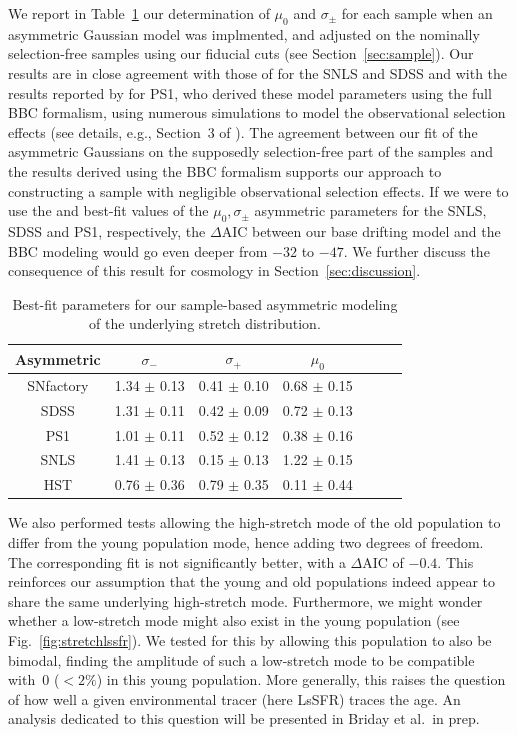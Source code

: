 \documentclass[]{aa}
\begin{document}
We report in Table~\ref{tab:bbc} our determination of $\mu_0$ and
$\sigma_{\pm}$ for each sample when an asymmetric Gaussian
model was implmented, and adjusted on the nominally selection-free samples using our fiducial cuts
(see Section~\ref{sec:sample}). Our results are in close agreement with those of
\cite{scolnic2016} for the SNLS and SDSS and with the results reported by \cite{scolnic2018a} for PS1, who
derived these model parameters using the full BBC formalism, using numerous
simulations to model the observational selection effects (see details,
e.g., Section~3 of \citealt{kessler2017}). The agreement between our fit of the
asymmetric Gaussians on the supposedly selection-free part of the samples and
the results derived using the BBC formalism supports our approach to
constructing a sample with negligible observational selection
effects. If we were to use the \cite{scolnic2016} and \cite{scolnic2018a} best-fit
values of the $\mu_0, \sigma_{\pm}$ asymmetric parameters for the SNLS, SDSS and
PS1, respectively, the $\Delta$AIC between our base drifting model and the BBC
modeling would go even deeper from $-32$ to $-47$. We further discuss the
consequence of this result for cosmology in Section~\ref{sec:discussion}.
    
\begin{table}
    \centering
    \caption{Best-fit parameters for our sample-based asymmetric modeling of the
    underlying stretch distribution.}
    \label{tab:bbc}
    \begin{tabular}{ccccccc}
    \hline\hline
    Asymmetric & $\sigma_{-}$ & $\sigma_{+}$ & $\mu_0$ \\
    \hline
    SNfactory & 1.34 $\pm$ 0.13 & 0.41 $\pm$ 0.10 & 0.68 $\pm$ 0.15 \\
    SDSS & 1.31 $\pm$ 0.11 & 0.42 $\pm$ 0.09 & 0.72 $\pm$ 0.13 \\
    PS1 & 1.01 $\pm$ 0.11 & 0.52 $\pm$ 0.12 & 0.38 $\pm$ 0.16 \\
    SNLS & 1.41 $\pm$ 0.13 & 0.15 $\pm$ 0.13 & 1.22 $\pm$ 0.15 \\
    HST & 0.76 $\pm$ 0.36 & 0.79 $\pm$ 0.35 & 0.11 $\pm$ 0.44 \\
    \hline
    \end{tabular}
\end{table}
    
We also performed tests allowing the high-stretch mode of the old population to
differ from the young population mode, hence adding two degrees of freedom. The
corresponding fit is not significantly better, with a $\Delta$AIC of $-0.4$.
This reinforces our assumption that the young and old populations
indeed appear to share the same underlying high-stretch mode. Furthermore, we
might wonder whether a low-stretch mode might also exist in the young population
(see Fig.~\ref{fig:stretchlssfr}). We tested for this by allowing this
population to also be bimodal, finding the amplitude of such a
low-stretch mode to be compatible with~0 ($<2\%$) in this young population. More
generally, this raises the question of how well a given environmental
tracer (here LsSFR) traces the age. An analysis dedicated to this question will
be presented in Briday et al.\ in prep.
\end{document}
